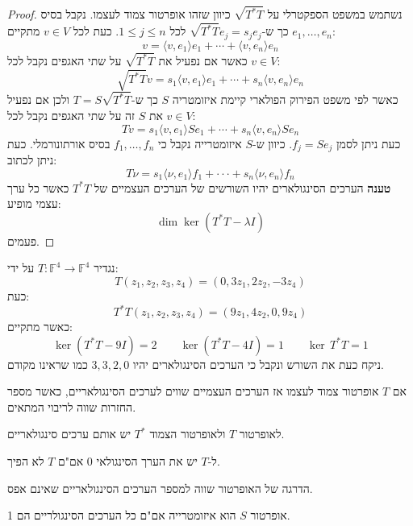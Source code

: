 \documentclass{tstextbook}
\begin{document}
\begin{proof}
נשתמש במשפט הספקטרלי על \(\sqrt{ T^{*}T }\) כיוון שזהו אופרטור צמוד לעצמו. נקבל בסיס \(e_{1},\dots,e_{n}\) כך ש-\(\sqrt{ T^{*}T }e_{j}=s_{j}e_{j}\) לכל \(1\leq j\leq n\). כעת לכל \(v \in V\) מתקיים:
$$v=\langle v,e_{1}\rangle e_{1}+\cdots+\langle v,e_{n}\rangle e_{n}$$
כאשר אם נפעיל את \(\sqrt{ T^{*}T }\) על שתי האגפים נקבל לכל \(v \in V\):
$${\sqrt{T^{*}T}}v=s_{1}\langle v,e_{1}\rangle e_{1}+\cdots+s_{n}\langle v,e_{n}\rangle e_{n}$$
כאשר לפי משפט הפירוק הפולארי קיימת איזומטריה \(S\) כך ש-\(T=S\sqrt{ T^{*}T }\) ולכן אם נפעיל את \(S\) זה על שתי האגפים נקבל לכל \(v \in V\):
$$T v=s_{1}\langle v,e_{1}\rangle S e_{1}+\cdots+s_{n}\langle v,e_{n}\rangle S e_{n}$$
כעת ניתן לסמן \(f_{j}=Se_{j}\). כיוון ש-\(S\) איזומטרייה נקבל כי \(f_{1},\dots,f_{n}\) בסיס אורתונורמלי. כעת ניתן לכתוב:
$$T\nu=s_{1}\langle\nu,e_{1}\rangle f_{1}+\cdot\cdot\cdot+s_{n}\langle\nu,e_{n}\rangle f_{n}$$\textbf{טענה}
הערכים הסינגולארים יהיו השורשים של הערכים העצמיים של \(T^{*}T\) כאשר כל ערך עצמי מופיע:
$$\dim\ker(T^{*}T-\lambda I)$$
פעמים.

\end{proof}
\begin{example}
נגדיר \(T:\mathbb{F} ^{4}\to \mathbb{F} ^{4}\) על ידי:
$$T(z_{1},z_{2},z_{3},z_{4})=(0,3z_{1},2z_{2},-3z_{4})$$
כעת:
$$T^{*}T(z_{1},z_{2},z_{3},z_{4})=(9z_{1},4z_{2},0,9z_{4})$$
כאשר מתקיים:
$$\ker(T^{*}T-9I)=2 \qquad \ker(T^{*}T-4I)=1 \qquad \ker\,T^{*}T=1$$
ניקח כעת את השורש ונקבל כי הערכים הסינגולארים יהיו \(3,3,2,0\) כמו שראינו מקודם.

\end{example}
\begin{proposition}
אם \(T\) אופרטור צמוד לעצמו אז הערכים העצמיים שווים לערכים הסינגולאריים, כאשר מספר החזרות שווה לריבוי המתאים.

\end{proposition}
\begin{proposition}
לאופרטור \(T\) ולאופרטור הצמוד \(T^{*}\) יש אותם ערכים סינגולאריים.

\end{proposition}
\begin{proposition}
ל-\(T\) יש את הערך הסינגולאי 0 אם"ם \(T\) לא הפיך.

\end{proposition}
\begin{proposition}
הדרגה של האופרטור שווה למספר הערכים הסינגולאריים שאינם אפס.

\end{proposition}
\begin{proposition}
אופרטור \(S\) הוא איזומטרייה אם"ם כל הערכים הסינגולריים הם 1.

\end{proposition}
\end{document}
